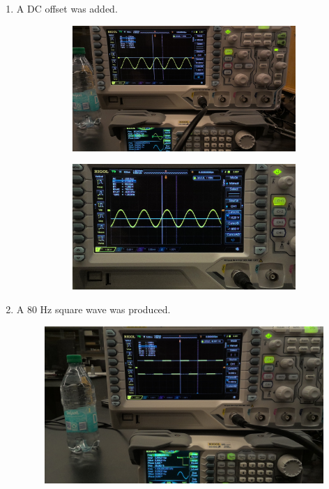 \documentclass{article}
\begin{document}
\begin{enumerate}[label=(\alph*)]
                \item A DC offset was added.
                \begin{figure}[p]
                    \begin{subfigure}{\textwidth/2}
                        \includegraphics[width=\linewidth]{d v.jpg}
                    \end{subfigure}
                    \begin{subfigure}{\textwidth/2}
                        \includegraphics[width=\linewidth]{d offset.jpg}
                    \end{subfigure}
                    \caption{}
                \end{figure}
                
                \item A 80 Hz square wave was produced.
                \begin{figure}
                    \includegraphics[width=\textwidth/2]{e.jpg}
                    \caption{}
                \end{figure}


\end{enumerate}
\end{document}
